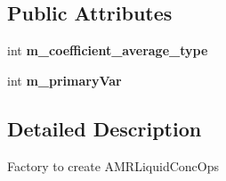 \subsection*{Public Attributes}
\begin{DoxyCompactItemize}
\item 
\hypertarget{class_a_m_r_liquid_conc_op_factory_a55f28feb4920e37e186ac18d443e93dc}{int {\bfseries m\-\_\-coefficient\-\_\-average\-\_\-type}}\label{class_a_m_r_liquid_conc_op_factory_a55f28feb4920e37e186ac18d443e93dc}

\item 
\hypertarget{class_a_m_r_liquid_conc_op_factory_a473654f3e7a954eadb5de1b06a99c817}{int {\bfseries m\-\_\-primary\-Var}}\label{class_a_m_r_liquid_conc_op_factory_a473654f3e7a954eadb5de1b06a99c817}

\end{DoxyCompactItemize}


\subsection{Detailed Description}
Factory to create A\-M\-R\-Liquid\-Conc\-Ops 


